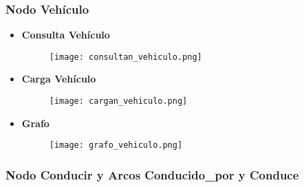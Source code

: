 \documentclass[a4paper]{article}
\begin{document}
\subsubsection{\Large{Nodo Vehículo}}

\begin{itemize}

    \item \textbf{\large{Consulta Vehículo}}

    \begin{figure}[H]
        \centering
        \texttt{[image: consultan\_vehiculo.png]}
        \label{fig:consultan_vehiculo}
    \end{figure}

    \item \textbf{\large{Carga Vehículo}}

    \begin{figure}[H]
        \centering
        \texttt{[image: cargan\_vehiculo.png]}
        \label{fig:cargan_vehiculo}
    \end{figure}

\newpage

    \item \textbf{\large{Grafo}}

    \begin{figure}[H]
        \centering
        \texttt{[image: grafo\_vehiculo.png]}
        \label{fig:grafo_vehiculo}
    \end{figure}

\end{itemize}

\subsubsection{\Large{Nodo Conducir y Arcos Conducido\_por y Conduce}}
\end{document}
